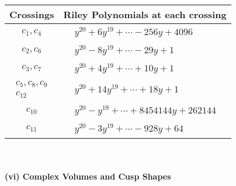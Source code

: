 \documentclass[1p]{elsarticle_modified}
\theoremstyle{definition}
\begin{document}
\begin{tabular}{m{50pt}|m{274pt}}
Crossings & \hspace{64pt}Riley Polynomials at each crossing \\
\hline $$\begin{aligned}c_{1},c_{4}\end{aligned}$$&$\begin{aligned}
&y^{20}+6 y^{19}+\cdots-256 y+4096
\end{aligned}$\\
\hline $$\begin{aligned}c_{2},c_{6}\end{aligned}$$&$\begin{aligned}
&y^{20}-8 y^{19}+\cdots-29 y+1
\end{aligned}$\\
\hline $$\begin{aligned}c_{3},c_{7}\end{aligned}$$&$\begin{aligned}
&y^{20}+4 y^{19}+\cdots+10 y+1
\end{aligned}$\\
\hline $$\begin{aligned}c_{5},c_{8},c_{9}\\c_{12}\end{aligned}$$&$\begin{aligned}
&y^{20}+14 y^{19}+\cdots+18 y+1
\end{aligned}$\\
\hline $$\begin{aligned}c_{10}\end{aligned}$$&$\begin{aligned}
&y^{20}- y^{19}+\cdots+8454144 y+262144
\end{aligned}$\\
\hline $$\begin{aligned}c_{11}\end{aligned}$$&$\begin{aligned}
&y^{20}-3 y^{19}+\cdots-928 y+64
\end{aligned}$\\
\hline
\end{tabular}\\~\\
\newpage\flushleft \textbf{(vi) Complex Volumes and Cusp Shapes}
\end{document}
